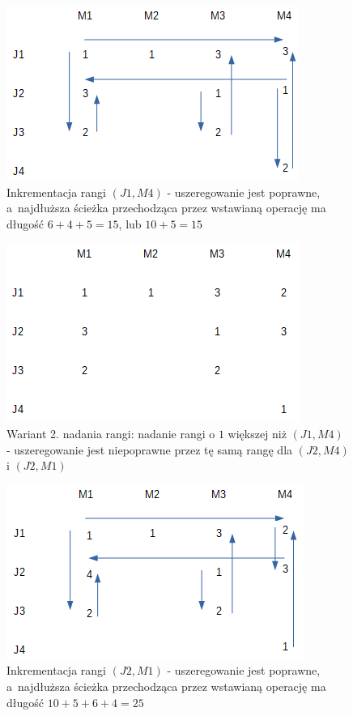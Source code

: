 \documentclass[brudnopis]{xmgr}
\begin{document}
\begin{figure}[!tbh]
\centering
\includegraphics[width=.7\hsize]{fig/1.png}
\caption{Inkrementacja rangi $(J1, M4)$ - uszeregowanie jest poprawne, a~najdłuższa ścieżka przechodząca przez wstawianą operację ma długość $6 + 4 + 5 = 15$, lub $10 + 5 = 15$\label{diag:state1}}
\end{figure}\medskip
 
\begin{figure}[!tbh]
\centering
\includegraphics[width=.7\hsize]{fig/3_1.png}
\caption{Wariant 2. nadania rangi: nadanie rangi o $1$ większej niż $(J1, M4)$ - uszeregowanie jest niepoprawne przez tę samą rangę dla $(J2, M4)$ i $(J2, M1)$\label{diag:state3_1}}
\end{figure}\medskip

\begin{figure}[!tbh]
\centering
\includegraphics[width=.7\hsize]{fig/2.png}
\caption{Inkrementacja rangi $(J2, M1)$ - uszeregowanie jest poprawne, a~najdłuższa ścieżka przechodząca przez wstawianą operację ma długość $10 + 5 + 6 + 4 = 25$\label{diag:state2}}
\end{figure}\medskip
\end{document}
